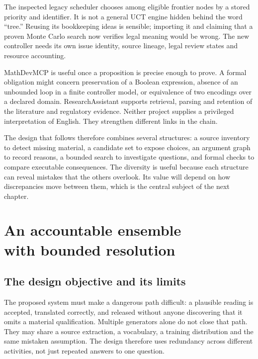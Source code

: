 \documentclass[12pt,a4paper,oneside,openany]{book}
\begin{document}
The inspected legacy scheduler chooses among eligible frontier nodes by a stored
priority and identifier. It is not a general UCT engine hidden behind the word
``tree.'' Reusing its bookkeeping ideas is sensible; importing it and claiming
that a proven Monte Carlo search now verifies legal meaning would be wrong. The
new controller needs its own issue identity, source lineage, legal review states
and resource accounting.

MathDevMCP is useful once a proposition is precise enough to prove. A formal
obligation might concern preservation of a Boolean expression, absence of an
unbounded loop in a finite controller model, or equivalence of two encodings over
a declared domain. ResearchAssistant supports retrieval, parsing and retention
of the literature and regulatory evidence. Neither project supplies a privileged
interpretation of English. They strengthen different links in the chain.

The design that follows therefore combines several structures: a source inventory
to detect missing material, a candidate set to expose choices, an argument graph
to record reasons, a bounded search to investigate questions, and formal checks
to compare executable consequences. The diversity is useful because each
structure can reveal mistakes that the others overlook. Its value will depend on
how discrepancies move between them, which is the central subject of the next
chapter.

\chapter[An accountable ensemble with bounded resolution]{An accountable ensemble\\with bounded resolution}
\label{ch:ensemble}

\section{The design objective and its limits}

The proposed system must make a dangerous path difficult: a plausible reading is
accepted, translated correctly, and released without anyone discovering that it
omits a material qualification. Multiple generators alone do not close that path.
They may share a source extraction, a vocabulary, a training distribution and the
same mistaken assumption. The design therefore uses redundancy across different
activities, not just repeated answers to one question.
\end{document}
